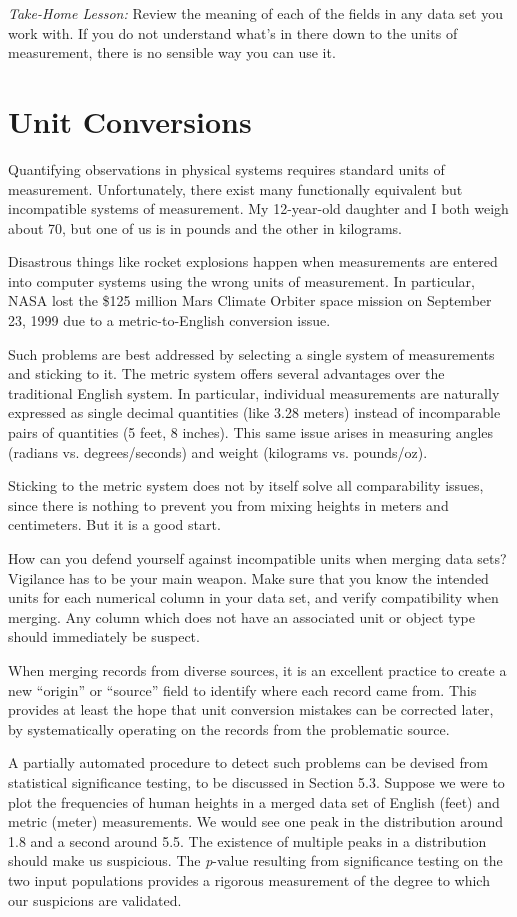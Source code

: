 \documentclass[10pt]{article}
\begin{document}
\textit{Take-Home Lesson:} Review the meaning of each of the fields in any data set you work with. If you do not understand what’s in there down to the units of measurement, there is no sensible way you can use it.

\section{Unit Conversions}
Quantifying observations in physical systems requires standard units of measurement. Unfortunately, there exist many functionally equivalent but incompatible systems of measurement. My 12-year-old daughter and I both weigh about 70, but one of us is in pounds and the other in kilograms.

Disastrous things like rocket explosions happen when measurements are entered into computer systems using the wrong units of measurement. In particular, NASA lost the \$125 million Mars Climate Orbiter space mission on September 23, 1999 due to a metric-to-English conversion issue.

Such problems are best addressed by selecting a single system of measurements and sticking to it. The metric system offers several advantages over the traditional English system. In particular, individual measurements are naturally expressed as single decimal quantities (like 3.28 meters) instead of incomparable pairs of quantities (5 feet, 8 inches). This same issue arises in measuring angles (radians vs. degrees/seconds) and weight (kilograms vs. pounds/oz).

Sticking to the metric system does not by itself solve all comparability issues, since there is nothing to prevent you from mixing heights in meters and centimeters. But it is a good start.

How can you defend yourself against incompatible units when merging data sets? Vigilance has to be your main weapon. Make sure that you know the intended units for each numerical column in your data set, and verify compatibility when merging. Any column which does not have an associated unit or object type should immediately be suspect.

When merging records from diverse sources, it is an excellent practice to create a new ``origin'' or ``source'' field to identify where each record came from. This provides at least the hope that unit conversion mistakes can be corrected later, by systematically operating on the records from the problematic source.

A partially automated procedure to detect such problems can be devised from statistical significance testing, to be discussed in Section 5.3. Suppose we were to plot the frequencies of human heights in a merged data set of English (feet) and metric (meter) measurements. We would see one peak in the distribution around 1.8 and a second around 5.5. The existence of multiple peaks in a distribution should make us suspicious. The \textit{p}-value resulting from significance testing on the two input populations provides a rigorous measurement of the degree to which our suspicions are validated.
\end{document}
